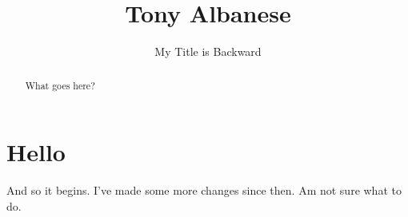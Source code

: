 \documentclass[]{article}
\title{Tony Albanese}
\author{My Title is Backward}
\begin{document}
\maketitle

\begin{abstract}
What goes here?
\end{abstract}

\section{Hello}
And so it begins. I've made some more changes since then. Am not sure what to do.
\end{document}
